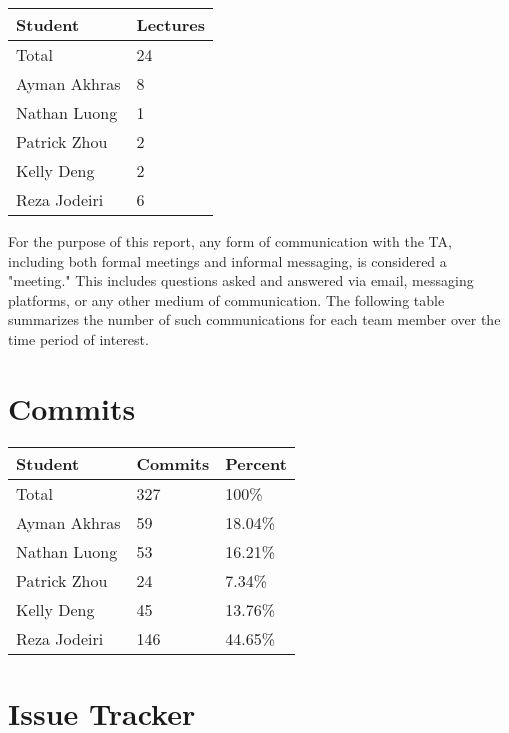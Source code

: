 \documentclass{article}
\begin{document}
\begin{table}[H]
\centering
\begin{tabular}{ll}
\toprule
\textbf{Student} & \textbf{Lectures}\\
\midrule
Total & 24\\
Ayman Akhras & 8\\
Nathan Luong & 1\\
Patrick Zhou & 2\\
Kelly Deng & 2\\
Reza Jodeiri & 6\\
\bottomrule
\end{tabular}
\end{table}

For the purpose of this report, any form of communication with the TA, including both formal meetings and informal messaging, is considered a "meeting." This includes questions asked and answered via email, messaging platforms, or any other medium of communication. The following table summarizes the number of such communications for each team member over the time period of interest.

\section{Commits}


\begin{table}[H]
\centering
\begin{tabular}{lll}
\toprule
\textbf{Student} & \textbf{Commits} & \textbf{Percent}\\
\midrule
Total & 327 & 100\% \\
Ayman Akhras & 59 & 18.04\%\\
Nathan Luong & 53 & 16.21\%\\
Patrick Zhou & 24 & 7.34\%\\
Kelly Deng & 45 & 13.76\%\\
Reza Jodeiri & 146 & 44.65\%\\
\bottomrule
\end{tabular}
\end{table}



\section{Issue Tracker}

\end{document}
